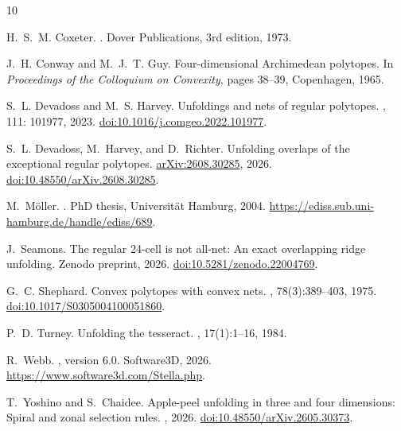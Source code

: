 \documentclass[11pt,letterpaper]{article}
\begin{document}
\begin{thebibliography}{10}

H.~S.~M. Coxeter.
.
\newblock Dover Publications, 3rd edition, 1973.

J.~H. Conway and M.~J.~T. Guy.
\newblock Four-dimensional Archimedean polytopes.
\newblock In {\em Proceedings of the Colloquium on Convexity},
  pages 38--39, Copenhagen, 1965.

S.~L. Devadoss and M.~S. Harvey.
\newblock Unfoldings and nets of regular polytopes.
,
  111: 101977, 2023.
\newblock \href{https://doi.org/10.1016/j.comgeo.2022.101977}
  {doi:10.1016/j.comgeo.2022.101977}.

S.~L. Devadoss, M.~Harvey, and D.~Richter.
\newblock Unfolding overlaps of the exceptional regular polytopes.
\newblock \href{https://arxiv.org/abs/2608.30285}{arXiv:2608.30285}, 2026.
\newblock \href{https://doi.org/10.48550/arXiv.2608.30285}
  {doi:10.48550/arXiv.2608.30285}.

M.~M\"oller.
.
\newblock PhD thesis, Universit\"at Hamburg, 2004.
\newblock \href{https://ediss.sub.uni-hamburg.de/handle/ediss/689}
  {https://ediss.sub.uni-hamburg.de/handle/ediss/689}.

J.~Seamons.
\newblock The regular 24-cell is not all-net: An exact overlapping ridge
  unfolding.
\newblock Zenodo preprint, 2026.
\newblock \href{https://doi.org/10.5281/zenodo.22004769}
  {doi:10.5281/zenodo.22004769}.

G.~C. Shephard.
\newblock Convex polytopes with convex nets.
, 78(3):389--403, 1975.
\newblock \href{https://doi.org/10.1017/S0305004100051860}
  {doi:10.1017/S0305004100051860}.

P.~D. Turney.
\newblock Unfolding the tesseract.
, 17(1):1--16, 1984.

R.~Webb.
, version 6.0.
\newblock Software3D, 2026.
\newblock \href{https://www.software3d.com/Stella.php}
  {https://www.software3d.com/Stella.php}.

T.~Yoshino and S.~Chaidee.
\newblock Apple-peel unfolding in three and four dimensions:
  Spiral and zonal selection rules.
, 2026.
\newblock \href{https://doi.org/10.48550/arXiv.2605.30373}
  {doi:10.48550/arXiv.2605.30373}.

\end{thebibliography}
\end{document}
